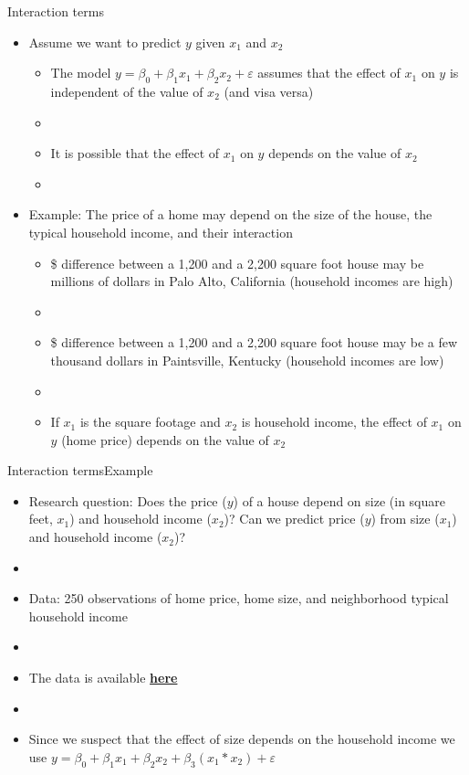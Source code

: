 \documentclass[xcolor=dvipsnames]{beamer}
\begin{document}
\begin{frame}{Interaction terms}
	\begin{itemize}
		\item Assume we want to predict $y$ given $x_1$ and $x_2$
		\begin{itemize}
			\item The model $y = \beta_0 + \beta_1 x_1 + \beta_2 x_2 + \varepsilon$ assumes that the effect of $x_1$ on $y$ is independent of the value of $x_2$ (and visa versa)
			\item[]
			\item It is possible that the effect of $x_1$ on $y$ depends on the value of $x_2$ 
			\item[]
		\end{itemize}
		\item Example: The price of a home may depend on the size of the house, the typical household income, and their interaction
		\begin{itemize}
			\item \$ difference between a 1,200 and a 2,200 square foot house may be millions of dollars in Palo Alto, California (household incomes are high) 
			\item[]
			\item \$ difference between a 1,200 and a 2,200 square foot house may be a few thousand dollars in Paintsville, Kentucky (household incomes are low) 
			\item[]
			\item If $x_1$ is the square footage and $x_2$ is household income, the effect of $x_1$ on $y$ (home price) depends on the value of $x_2$ 
		\end{itemize}
	\end{itemize}
\end{frame}

\begin{frame}{Interaction terms}{Example}
	\begin{itemize}
		\item Research question: Does the price ($y$) of a house depend on size (in square feet, $x_1$) and household income ($x_2$)? Can we predict price ($y$) from size ($x_1$) and household income ($x_2$)?
		\item[]
		\item Data: 250 observations of home price, home size, and neighborhood typical household income
		\item[]
		\item The data is available  \href{https://wordpress.nmsu.edu/ptrainor/2019/11/26/ast-505-materials/}{\textbf{here}}
		\item[]
		\item Since we suspect that the effect of size depends on the household income we use $y = \beta_0 + \beta_1 x_1 + \beta_2 x_2 + \beta_3 (x_1 * x_2) + \varepsilon$
	\end{itemize}
\end{frame}
\end{document}
